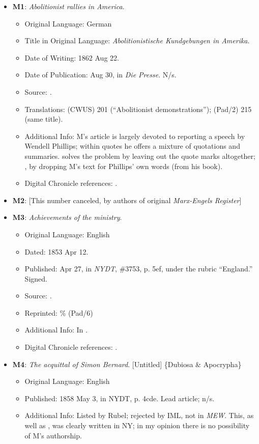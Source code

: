 \begin{itemize}
    \item \textbf{M1}: \textit{Abolitionist rallies in America}.
    \begin{itemize}
        \item Original Language: German
        \item Title in Original Language: \textit{Abolitionistische Kundgebungen in Amerika}.
        \item Date of Writing: 1862 Aug 22.
        \item Date of Publication: Aug 30, in \textit{Die Presse}. N/s.
        \item Source: .
        \item Translations:  (CWUS) 201 (``Abolitionist demonstrations'');  (Pad/2) 215 (same title).
        \item Additional Info: M's article is largely devoted to reporting a speech by Wendell Phillips; within quotes he offers a mixture of quotations and summaries.  solves the problem by leaving out the quote marks altogether; , by dropping M's text for Phillips' own words (from his book).
        \item Digital Chronicle references: .
    \end{itemize}
    
    \item \textbf{M2}: [This number canceled, by authors of original \textit{Marx-Engels Register}]
    
    \item \textbf{M3}: \textit{Achievements of the ministry}.
    \begin{itemize}
        \item Original Language: English
        \item Dated: 1853 Apr 12.
        \item Published: Apr 27, in \textit{NYDT}, \#3753, p. 5ef, under the rubric ``England.'' Signed.
        \item Source: .
        \item Reprinted: \% (Pad/6)
        \item Additional Info: In .
        \item Digital Chronicle references: .
    \end{itemize}
    
    \item \textbf{M4}: \textit{The acquittal of Simon Bernard}. [Untitled] \{Dubiosa \& Apocrypha\}
    \begin{itemize}
        \item Original Language: English
        \item Published: 1858 May 3, in NYDT, p. 4cde. Lead article; n/s.
        \item Additional Info: Listed by Rubel; rejected by IML, not in \textit{MEW}. This, as well as , was clearly written in NY; in my opinion there is no possibility of M's authorship.
    \end{itemize}


\end{itemize}
